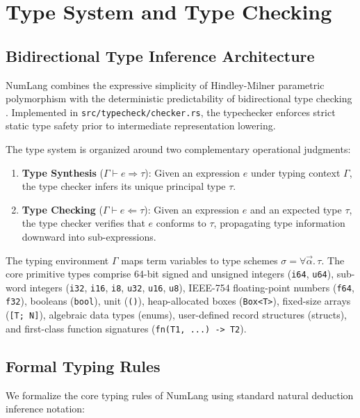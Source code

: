 \chapter{Type System and Type Checking}
\label{chap:types}

\section{Bidirectional Type Inference Architecture}
\label{sec:types:bidirectional}

NumLang combines the expressive simplicity of Hindley-Milner parametric polymorphism with the deterministic predictability of bidirectional type checking \citep{pierce2000local}. Implemented in \texttt{src/typecheck/checker.rs}, the typechecker enforces strict static type safety prior to intermediate representation lowering.

The type system is organized around two complementary operational judgments:
\begin{enumerate}
    \item \textbf{Type Synthesis} ($\Gamma \vdash e \Rightarrow \tau$): Given an expression $e$ under typing context $\Gamma$, the type checker infers its unique principal type $\tau$.
    \item \textbf{Type Checking} ($\Gamma \vdash e \Leftarrow \tau$): Given an expression $e$ and an expected type $\tau$, the type checker verifies that $e$ conforms to $\tau$, propagating type information downward into sub-expressions.
\end{enumerate}

The typing environment $\Gamma$ maps term variables to type schemes $\sigma = \forall \vec{\alpha}.\,\tau$. The core primitive types comprise 64-bit signed and unsigned integers (\texttt{i64}, \texttt{u64}), sub-word integers (\texttt{i32}, \texttt{i16}, \texttt{i8}, \texttt{u32}, \texttt{u16}, \texttt{u8}), IEEE-754 floating-point numbers (\texttt{f64}, \texttt{f32}), booleans (\texttt{bool}), unit (\texttt{()}), heap-allocated boxes (\texttt{Box<T>}), fixed-size arrays (\texttt{[T; N]}), algebraic data types (enums), user-defined record structures (structs), and first-class function signatures (\texttt{fn(T1, ...) -> T2}).

\section{Formal Typing Rules}
\label{sec:types:rules}

We formalize the core typing rules of NumLang using standard natural deduction inference notation:

